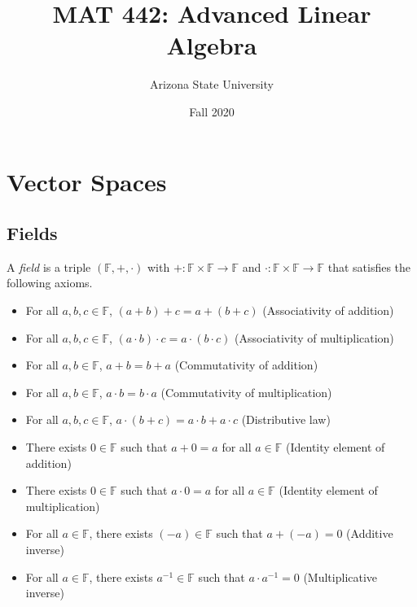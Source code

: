 \documentclass[12pt]{article}
\title{MAT 442: Advanced Linear Algebra}
\date{Fall 2020}
\author{Arizona State University}
\newenvironment{definition}[2][Definition]{\begin{trivlist}
\item[\hskip \labelsep {\bfseries #1}\hskip \labelsep {\bfseries #2}]}{\end{trivlist}}
\begin{document}

\maketitle
\newpage
\tableofcontents
\newpage


\section{Vector Spaces}

\subsection{Fields}

\begin{definition}{1}
A \textit{field} is a triple $(\mathbb{F}, +, \cdot)$ with $+: \mathbb{F} \times \mathbb{F} \to \mathbb{F}$ and $\cdot : \mathbb{F} \times \mathbb{F} \to \mathbb{F}$ that satisfies the following axioms.
\begin{itemize}
    \item[(1)] For all $a,b,c \in \mathbb{F}$, $(a + b) + c = a + (b + c)$ (Associativity of addition)
    \item[(2)] For all $a,b,c \in \mathbb{F}$, $(a \cdot b) \cdot c = a \cdot (b \cdot c)$ (Associativity of multiplication)
    \item[(3)] For all $a,b \in \mathbb{F}$, $a + b = b + a$ (Commutativity of addition)
    \item[(4)] For all $a,b \in \mathbb{F}$, $a \cdot b = b \cdot a$ (Commutativity of multiplication)
    \item[(5)] For all $a,b,c \in \mathbb{F}$, $a \cdot (b + c) = a \cdot b + a \cdot c$ (Distributive law)
    \item[(6)] There exists $0 \in \mathbb{F}$ such that $a + 0 = a$ for all $a \in \mathbb{F}$ (Identity element of addition)
    \item[(7)] There exists $0 \in \mathbb{F}$ such that $a \cdot 0 = a$ for all $a \in \mathbb{F}$ (Identity element of multiplication)
    \item[(8)] For all $a \in \mathbb{F}$, there exists $(-a) \in \mathbb{F}$ such that $a + (-a) = 0$ (Additive inverse)
    \item[(9)] For all $a \in \mathbb{F}$, there exists $a^{-1} \in \mathbb{F}$ such that $a \cdot a^{-1} = 0$ (Multiplicative inverse)
\end{itemize}
\end{definition}
\end{document}
